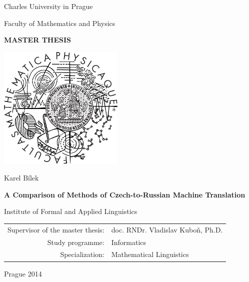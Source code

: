 

\pagestyle{empty}
\begin{center}

\large

Charles University in Prague

\medskip

Faculty of Mathematics and Physics

\vfill

{\bf\Large MASTER THESIS}

\vfill

\centerline{\mbox{\includegraphics[width=60mm]{../img/logo.pdf}}}

\vfill
\vspace{5mm}

{\LARGE Karel Bílek}

\vspace{15mm}

{\LARGE\bfseries A Comparison of Methods of Czech-to-Russian Machine Translation}

\vfill

Institute of Formal and Applied Linguistics

\vfill

\begin{tabular}{rl}

Supervisor of the master thesis: & doc. RNDr. Vladislav Kuboň, Ph.D. \\
\noalign{\vspace{2mm}}
Study programme: & Informatics \\
\noalign{\vspace{2mm}}
Specialization: & Mathematical Linguistics \\
\end{tabular}

\vfill

Prague 2014

\end{center}

